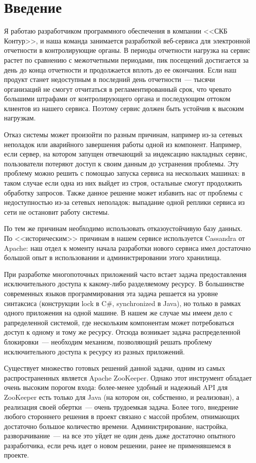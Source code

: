 \section{Введение}

Я работаю разработчиком программного обеспечения в компании <<СКБ Контур>>, и наша команда занимается разработкой веб-сервиса для электронной отчетности в контролирующие органы. В периоды отчетности нагрузка на сервис растет по сравнению с межотчетными периодами, пик посещений достигается за день до конца отчетности и продолжается вплоть до ее окончания. Если наш продукт станет недоступным в последний день отчетности~--- тысячи организаций не смогут отчитаться в регламентированный срок, что чревато большими штрафами от контролирующего органа и последующим оттоком клиентов из нашего сервиса. Поэтому сервис должен быть устойчив к высоким нагрузкам.

Отказ системы может произойти по разным причинам, например из-за сетевых неполадок или аварийного завершения работы одной из компонент. Например, если сервер, на котором запущен отвечающий за индексацию накладных сервис, пользователи потеряют доступ к своим данным до устранения проблемы. Эту проблему можно решить с помощью запуска сервиса на нескольких машинах: в таком случае если одна из них выйдет из строя, остальные смогут продолжить обработку запросов. Также данное решение может избавить нас от проблемы с недоступностью из-за сетевых неполадок: выпадание одной реплики сервиса из сети не остановит работу системы.

По тем же причинам необходимо использовать отказоустойчивую базу данных. По <<историческим>> причинам в нашем сервисе используется Cassandra от Apache: наш отдел к моменту начала разработки нового сервиса имел достаточно большой опыт в использовании и администрировании этого хранилища.

При разработке многопоточных приложений часто встает задача предоставления исключительного доступа к какому-либо разделяемому ресурсу. В большинстве современных языков программирования эта задача решается на уровне синтаксиса (конструкции lock в C\#, synchronized в Java), но только в рамках одного приложения на одной машине. В нашем же случае мы имеем дело с рапределенной системой, где нескольким компонентам может потребоваться доступ к одному и тому же ресурсу. Отсюда возникает задача распределенной блокировки~--- необходим механизм, позволяющий решать проблему исключительного доступа к ресурсу из разных приложений.

Существует множество готовых решений данной задачи, одним из самых распространенных является Apache ZooKeeper. Однако этот инструмент обладает очень высоким порогом входа: более-менее удобный и надежный API для ZooKeeper есть только для Java (на котором он, собственно, и реализован), а реализация своей обертки~--- очень трудоемкая задача. Более того, внедрение любого стороннего решения в проект связано с массой проблем, отнимающих достаточно большое количество времени. Администрирование, настройка, разворачивание~--- на все это уйдет не один день даже достаточно опытного разработчика, если речь идет о новом решении, ранее не применявшемся в проекте.

